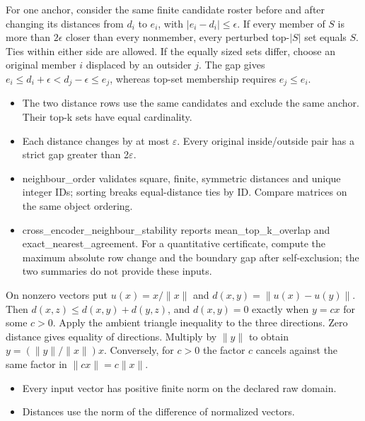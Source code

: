 \expandafter\def\csname statadic@statement@STATADIC-NEIGHBOUR-001\endcsname{For one anchor, consider the same finite candidate roster before and
  after changing its distances from $d_i$ to $e_i$, with $|e_i-d_i|\le\epsilon$.
  If every member of $S$ is more than $2\epsilon$ closer than every nonmember,
  every perturbed top-$|S|$ set equals $S$. Ties within either side are allowed.}
\expandafter\def\csname statadic@proof@STATADIC-NEIGHBOUR-001\endcsname{If the equally sized sets differ, choose an original member $i$
  displaced by an outsider $j$. The gap gives
  $e_i\le d_i+\epsilon<d_j-\epsilon\le e_j$, whereas top-set membership
  requires $e_j\le e_i$.}
\expandafter\def\csname statadic@assumptions@STATADIC-NEIGHBOUR-001\endcsname{\begin{itemize}
\item The two distance rows use the same candidates and exclude the same anchor. Their top-k sets have equal cardinality.
\item Each distance changes by at most \ensuremath{\varepsilon}. Every original inside/outside pair has a strict gap greater than 2\ensuremath{\varepsilon}.
\end{itemize}}
\expandafter\def\csname statadic@diagnostics@STATADIC-NEIGHBOUR-001\endcsname{\begin{itemize}
\item neighbour\_order validates square, finite, symmetric distances and unique integer IDs; sorting breaks equal-distance ties by ID. Compare matrices on the same object ordering.
\item cross\_encoder\_neighbour\_stability reports mean\_top\_k\_overlap and exact\_nearest\_agreement. For a quantitative certificate, compute the maximum absolute row change and the boundary gap after self-exclusion; the two summaries do not provide these inputs.
\end{itemize}}
\expandafter\def\csname statadic@statement@STATADIC-GROUND-001\endcsname{On nonzero vectors put $u(x)=x/\|x\|$ and
  $d(x,y)=\|u(x)-u(y)\|$. Then $d(x,z)\le d(x,y)+d(y,z)$, and
  $d(x,y)=0$ exactly when $y=cx$ for some $c>0$.}
\expandafter\def\csname statadic@proof@STATADIC-GROUND-001\endcsname{Apply the ambient triangle inequality to the three directions.
  Zero distance gives equality of directions. Multiply by $\|y\|$ to obtain
  $y=(\|y\|/\|x\|)x$. Conversely, for $c>0$ the factor $c$ cancels
  against the same factor in $\|cx\|=c\|x\|$.}
\expandafter\def\csname statadic@assumptions@STATADIC-GROUND-001\endcsname{\begin{itemize}
\item Every input vector has positive finite norm on the declared raw domain.
\item Distances use the norm of the difference of normalized vectors.
\end{itemize}}

